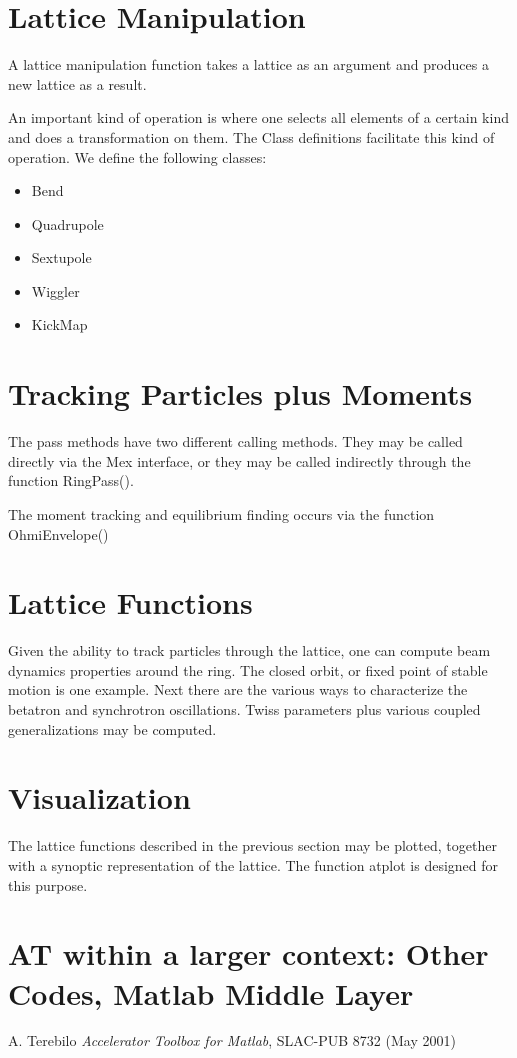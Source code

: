 \documentclass[acus]{article}
\begin{document}
\section{Lattice Manipulation}
A lattice manipulation function takes a lattice as an argument and produces a new lattice as a result.

An important kind of operation is where one selects all elements of a certain kind and does a transformation on them.
The Class definitions facilitate this kind of operation.
We define the following classes:
\begin{itemize}
\item Bend
\item Quadrupole
\item Sextupole
\item Wiggler
\item KickMap
\end{itemize}


\section{Tracking Particles plus Moments}
The pass methods have two different calling methods.  They may be called directly via the Mex interface, or they may 
be called indirectly through the function RingPass().

The moment tracking and equilibrium finding occurs via the function OhmiEnvelope()

\section{Lattice Functions}
Given the ability to track particles through the lattice, one can compute beam dynamics properties around the ring.  The closed orbit, or fixed point of stable motion is one example.  Next there are the various ways to characterize the betatron and synchrotron oscillations.  Twiss parameters plus various coupled generalizations may be computed.

\section{Visualization}
The lattice functions described in the previous section may be plotted, together with a synoptic representation of the lattice.  The function atplot is designed for this purpose.

\section{AT within a larger context: Other Codes, Matlab Middle Layer}

\begin{thebibliography}{2}

A. Terebilo \emph{Accelerator Toolbox for Matlab}, SLAC-PUB 8732 (May 2001)

\end{thebibliography}
\end{document}
